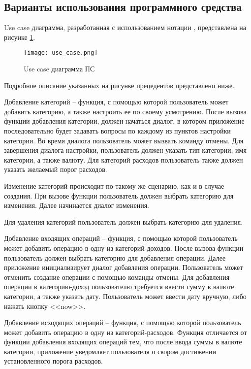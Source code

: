 \subsection{Варианты использования программного средства} 
\label{sec:domain:model:use_cases}

Use case диаграмма, разработанная с использованием нотации \linebreak \uml, представлена на рисунке \ref{fig:domain:model:use_cases:model}.

\begin{figure}[!h]
\centering
	\texttt{[image: use\_case.png]}
	\caption{Use case диаграмма ПС}
	\label{fig:domain:model:use_cases:model}
\end{figure}

Подробное описание указанных на рисунке прецедентов представлено ниже.

Добавление категорий -- функция, с помощью которой пользователь может добавить категорию, а также настроить ее по своему усмотрению. После вызова функции добавления категории, должен начаться диалог, в котором приложение последовательно будет задавать вопросы по каждому из пунктов настройки категории. Во время диалога пользователь может вызвать команду отмены. Для завершения диалога настройки, пользователь должен указать тип категории, имя категории, а также валюту. Для категорий расходов пользователь также должен указать желаемый порог расходов.

Изменение категорий происходит по такому же сценарию, как и в случае создания. При вызове функции пользователь должен выбрать категорию для изменения. Далее начинается диалог изменения.

Для удаления категорий пользователь должен выбрать категорию для удаления.

Добавление входящих операций -- функция, с помощью которой пользователь может добавить операцию в одну из категорий-доходов. После вызова функции пользователь должен выбрать категорию для добавления операции. Далее приложение инициализирует диалог добавления операции. Пользователь может отменить создание операции с помощью команды отмены. Для добавления операции в категорию-доход пользователю требуется ввести сумму в валюте категории, а также указать дату. Пользователь может ввести дату вручную, либо нажать кнопку <<now>>.

Добавление исходящих операций -- функция, с помощью которой пользователь может добавить операцию в одну из категорий-расходов. Функция отличается от функции добавления входящих операций тем, что после ввода суммы в валюте категории, приложение уведомляет пользователя о скором достижении установленного порога расходов.

